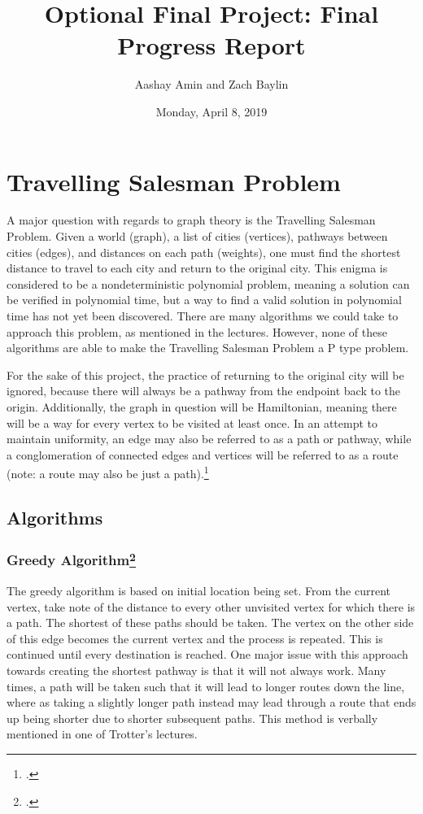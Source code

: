 \documentclass{article}
\title{Optional Final Project: Final Progress Report}
\author{Aashay Amin and Zach Baylin}
\date{Monday, April 8, 2019}
\begin{document}
  \maketitle
  \section{Travelling Salesman Problem}
    A major question with regards to graph theory is the Travelling Salesman Problem. Given a world (graph), a list of cities (vertices), pathways between cities (edges), and distances on each path (weights), one must find the shortest distance to travel to each city and return to the original city. This enigma is considered to be a nondeterministic polynomial problem, meaning a solution can be verified in polynomial time, but a way to find a valid solution in polynomial time has not yet been discovered. There are many algorithms we could take to approach this problem, as mentioned in the lectures. However, none of these algorithms are able to make the Travelling Salesman Problem a P type problem.
    \par For the sake of this project, the practice of returning to the original city will be ignored, because there will always be a pathway from the endpoint back to the origin. Additionally, the graph in question will be Hamiltonian, meaning there will be a way for every vertex to be visited at least once. In an attempt to maintain uniformity, an edge may also be referred to as a path or pathway, while a conglomeration of connected edges and vertices will be referred to as a route (note: a route may also be just a path).\footcite{weisstein_travelling_nodate}
  \subsection{Algorithms}
  \subsubsection{Greedy Algorithm\footcite{weisstein_travelling_nodate}}
    The greedy algorithm is based on initial location being set. From the current vertex, take note of the distance to every other unvisited vertex for which there is a path. The shortest of these paths should be taken. The vertex on the other side of this edge becomes the current vertex and the process is repeated. This is continued until every destination is reached.  One major issue with this approach towards creating the shortest pathway is that it will not always work. Many times, a path will be taken such that it will lead to longer routes down the line, where as taking a slightly longer path instead may lead through a route that ends up being shorter due to shorter subsequent paths. This method is verbally mentioned in one of Trotter’s lectures.
\end{document}
